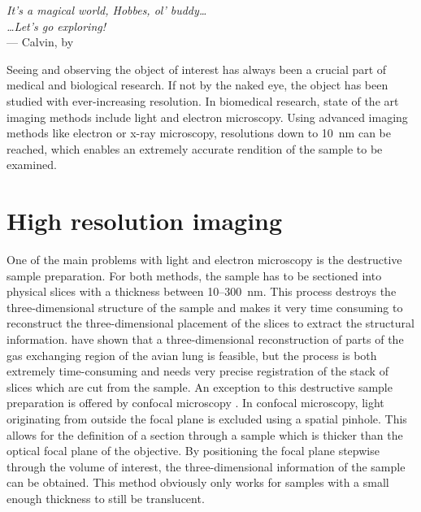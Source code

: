 \acresetall
{}\label{ch:Introduction}
\begin{flushright}{\slshape    
		It's a magical world, Hobbes, ol' buddy\ldots\\
		\ldots Let's go exploring!}\\ \medskip
		--- Calvin, by \citep{Watterson1996}
\end{flushright}
\vspace{52mm}

Seeing and observing the object of interest has always been a crucial part of medical and biological research. If not by the naked eye, the object has been studied with ever-increasing resolution. In biomedical research, state of the art imaging methods include light and electron microscopy. Using advanced imaging methods like electron or x-ray microscopy, resolutions down to \SI{10}{\nano\meter}  can be reached, which enables an extremely accurate rendition of the sample to be examined.

\section{High resolution imaging}
One of the main problems with light and electron microscopy is the destructive sample preparation. For both methods, the sample has to be sectioned into physical slices with a thickness between 10--\SI{300}{\nano\meter}. This process destroys the three-dimensional structure of the sample and makes it very time consuming to reconstruct the three-dimensional placement of the slices to extract the structural information. \citet{Woodward2005} have shown that a three-dimensional reconstruction of parts of the gas exchanging region of the avian lung is feasible, but the process is both extremely time-consuming and needs very precise registration of the stack of slices which are cut from the sample. An exception to this destructive sample preparation is offered by confocal microscopy \cite{Minsky1961}. In confocal microscopy, light originating from outside the focal plane is excluded using a spatial pinhole. This allows for the definition of a section through a sample which is thicker than the optical focal plane of the objective. By positioning the focal plane stepwise through the volume of interest, the three-dimensional information of the sample can be obtained. This method obviously only works for samples with a small enough thickness to still be translucent.

